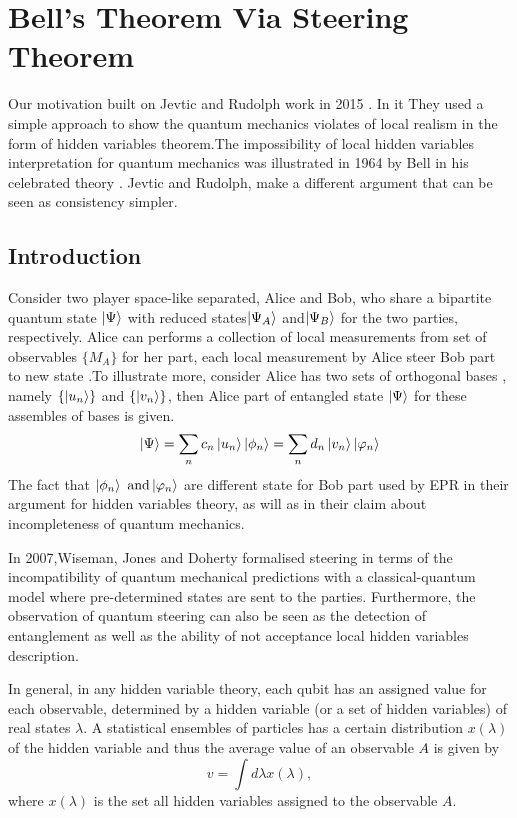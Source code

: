 \chapter{Bell's Theorem Via Steering Theorem}
Our motivation built on Jevtic and  Rudolph work in 2015 \citep*{Jevtic:2015:10.1364/JOSAB.32.000A50}. In it They used a simple approach to show the  quantum mechanics violates of local realism in the form of hidden variables theorem.The impossibility of local hidden variables interpretation for quantum mechanics was illustrated in 1964 by Bell in his celebrated theory \cite*{bell1964einstein}. Jevtic and  Rudolph, make a different argument that can be seen as consistency simpler.

\section{Introduction}\hfill \break
Consider two player space-like separated, Alice and Bob, who share a bipartite quantum state $\ket{\Psi}$ with reduced states$\ket{\Psi_A}$ and$\ket{\Psi_B}$ for the two parties, respectively. Alice can performs a collection of local measurements from set of observables $\{M_A\}$ for her part, each local measurement by Alice steer Bob part to new state \citep{book:474706}.To illustrate more, consider Alice has two sets of orthogonal bases , namely $\{\ket{u_n}\}$ and $\{\ket{v_n}\}$, then Alice part of entangled state $\ket{\Psi}$ for these assembles of bases is given.
\begin{equation}
\ket{\Psi}=\sum_n c_n  \ket{u_n}\ket{\phi_n}=\sum_n d_n\ket{v_n} \ket{\varphi_n}
\end{equation}
The fact that $\ket{\phi_n} \text{ and} \ket{\varphi_n}$ are different state for Bob part used by EPR in their argument for hidden variables theory, as will as in their claim about incompleteness of quantum mechanics.

 In 2007,Wiseman, Jones and Doherty formalised steering in terms of the incompatibility of quantum mechanical predictions with a classical-quantum model where pre-determined states are sent to the parties. Furthermore\citep*{PhysRevA.76.052116}, the observation of quantum steering can also be seen as the detection of entanglement as well as the ability of not acceptance local hidden variables description\cite{Jevtic:2015:10.1364/JOSAB.32.000A50}.


In general, in any hidden variable theory, each qubit has an assigned value for each observable, determined by a hidden variable (or a set of hidden variables) of real
states $\lambda$. A statistical ensembles of particles has a certain distribution $x(\lambda)$ of the hidden variable and thus the average value of an observable $A$ is given by
\begin{equation}
v=\int d \lambda x(\lambda),
\end{equation}
where $x(\lambda)$ is the set all hidden variables assigned to the observable $A$.



